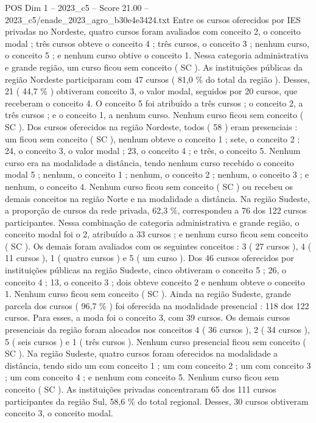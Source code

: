 \begin{textsample}{POS Dim 1 – 2023\_c5 – Score 21.00 – 2023\_c5/enade\_2023\_agro\_b30e4e3424.txt}
Entre os cursos oferecidos por IES privadas no Nordeste, quatro cursos foram avaliados com conceito 2, o conceito modal ; três cursos obteve o conceito 4 ; três cursos, o conceito 3 ; nenhum curso, o conceito 5 ; e nenhum curso obtive o conceito 1.
Nessa categoria administrativa e grande região, um curso ficou sem conceito ( SC ).
As instituições públicas da região Nordeste participaram com 47 cursos ( 81,0 \% do total da região ).
Desses, 21 ( 44,7 \% ) obtiveram conceito 3, o valor modal, seguidos por 20 cursos, que receberam o conceito 4.
O conceito 5 foi atribuído a três cursos ; o conceito 2, a três cursos ; e o conceito 1, a nenhum curso.
Nenhum curso ficou sem conceito ( SC ).
Dos cursos oferecidos na região Nordeste, todos ( 58 ) eram presenciais : um ficou sem conceito ( SC ), nenhum obteve o conceito 1 ; sete, o conceito 2 ; 24, o conceito 3, o valor modal ; 23, o conceito 4 ; e três, o conceito 5.
Nenhum curso era na modalidade a distância, tendo nenhum curso recebido o conceito modal 5 ; nenhum, o conceito 1 ; nenhum, o conceito 2 ; nenhum, o conceito 3 ; e nenhum, o conceito 4.
Nenhum curso ficou sem conceito ( SC ) ou recebeu os demais conceitos na região Norte e na modalidade a distância.
Na região Sudeste, a proporção de cursos da rede privada, 62,3 \%, correspondeu a 76 dos 122 cursos participantes.
Nessa combinação de categoria administrativa e grande região, o conceito modal foi o 2, atribuído a 33 cursos ; e nenhum curso ficou sem conceito ( SC ).
Os demais foram avaliados com os seguintes conceitos : 3 ( 27 cursos ), 4 ( 11 cursos ), 1 ( quatro cursos ) e 5 ( um curso ).
Dos 46 cursos oferecidos por instituições públicas na região Sudeste, cinco obtiveram o conceito 5 ; 26, o conceito 4 ; 13, o conceito 3 ; dois obteve conceito 2 e nenhum obteve o conceito 1.
Nenhum curso ficou sem conceito ( SC ).
Ainda na região Sudeste, grande parcela dos cursos ( 96,7 \% ) foi oferecida na modalidade presencial : 118 dos 122 cursos.
Para esses, a moda foi o conceito 3, com 39 cursos.
Os demais cursos presenciais da região foram alocados nos conceitos 4 ( 36 cursos ), 2 ( 34 cursos ), 5 ( seis cursos ) e 1 ( três cursos ).
Nenhum curso presencial ficou sem conceito ( SC ).
Na região Sudeste, quatro cursos foram oferecidos na modalidade a distância, tendo sido um com conceito 1 ; um com conceito 2 ; um com conceito 3 ; um com conceito 4 ; e nenhum com conceito 5.
Nenhum curso ficou sem conceito ( SC ).
As instituições privadas concentraram 65 dos 111 cursos participantes da região Sul, 58,6 \% do total regional.
Desses, 30 cursos obtiveram conceito 3, o conceito modal.

\end{textsample}
